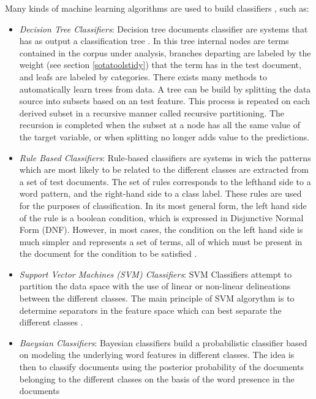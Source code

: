 \documentclass[]{book}
\begin{document}
Many kinds of machine learning algorithms are used to build classifiers
\citep{aggarwal2012survey}, such as:

\begin{itemize}
\item
  \emph{Decision Tree Classifiers}: Decision tree documents classifier
  are systems that has as output a classification tree
  \citep{sebastiani2002machine}. In this tree internal nodes are terms
  contained in the corpus under analysis, branches departing are labeled
  by the weight (see section \ref{sotatoolstidy}) that the term has in
  the test document, and leafs are labeled by categories. There exists
  many methods to automatically learn trees from data. A tree can be
  build by splitting the data source into subsets based on an test
  feature. This process is repeated on each derived subset in a
  recursive manner called recursive partitioning. The recursion is
  completed when the subset at a node has all the same value of the
  target variable, or when splitting no longer adds value to the
  predictions.
\item
  \emph{Rule Based Classifiers}: Rule-based classifiers are systems in
  wich the patterns which are most likely to be related to the different
  classes are extracted from a set of test documents. The set of rules
  corresponds to the lefthand side to a word pattern, and the right-hand
  side to a class label. These rules are used for the purposes of
  classification. In its most general form, the left hand side of the
  rule is a boolean condition, which is expressed in Disjunctive Normal
  Form (DNF). However, in most cases, the condition on the left hand
  side is much simpler and represents a set of terms, all of which must
  be present in the document for the condition to be satisfied
  \citep{yang2004building}.
\item
  \emph{Support Vector Machines (SVM) Classifiers}: SVM Classifiers
  attempt to partition the data space with the use of linear or
  non-linear delineations between the different classes. The main
  principle of SVM algorythm is to determine separators in the feature
  space which can best separate the different classes
  \citep[\citet{manevitz2001one}]{joachims1998text}.
\item
  \emph{Baeysian Classifiers}: Bayesian classifiers build a
  probabilistic classifier based on modeling the underlying word
  features in different classes. The idea is then to classify documents
  using the posterior probability of the documents belonging to the
  different classes on the basis of the word presence in the documents

\end{itemize}
\end{document}
